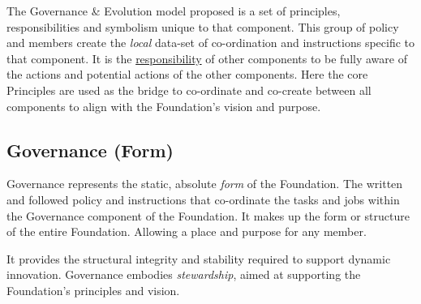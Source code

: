\documentclass[twocolumn,10pt]{article}
\begin{document}
The Governance \& Evolution model proposed is a set of principles, responsibilities and symbolism unique to that component.
This group of policy and members create the \textit{local} data-set of co-ordination and instructions specific to that component.
It is the \underline{responsibility} of other components to be fully aware of the actions and potential actions of the other components.
Here the core Principles are used as the bridge to co-ordinate and co-create between all components to align with the Foundation's vision and purpose.

\subsection*{Governance (Form)}
Governance represents the static, absolute \textit{form} of the Foundation.
The written and followed policy and instructions that co-ordinate the tasks and jobs within the Governance component of the Foundation.
It makes up the form or structure of the entire Foundation.
Allowing a place and purpose for any member.

It provides the structural integrity and stability required to support dynamic innovation.
Governance embodies \textit{stewardship}, aimed at supporting the Foundation's principles and vision.
\end{document}
